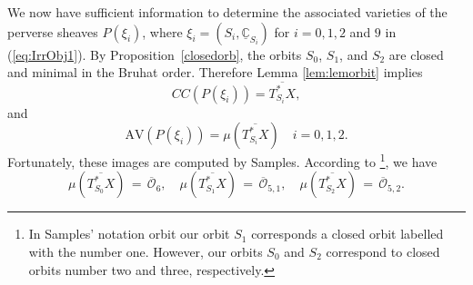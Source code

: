 \documentclass[a4paper, 11pt]{article}
\begin{document}
We now have sufficient information to determine the associated
varieties of the perverse sheaves $P(\xi_i)$, where $\xi_i = (S_i,
\underline{\mathbb{C}}_{S_i})$ for $i = 0, 1, 2$ and $9$ in (\ref{eq:IrrObj1}).  
By Proposition~\ref{closedorb}, the orbits $S_0$, $S_1$, and $S_2$ are
closed and minimal in the Bruhat order. Therefore  Lemma
\ref{lem:lemorbit} implies 
\begin{equation}
\label{CC012}
CC(P(\xi_i))=\overline{T_{S_{i}}^{\ast}X},
\end{equation}
and
$$
\mathrm{AV}(P(\xi_i))=\mu\left(\overline{T_{S_{i}}^{\ast}X}\right)
\quad i = 0,1,2.
$$
Fortunately, these images are computed by Samples. According to
\cite[{Proposition 4.1, tables 1 and 
    4}]{Samples}\footnote{In Samples' notation 
orbit our orbit $S_1$ corresponds a closed orbit labelled with the
number one. However, 
our orbits $S_0$ and $S_2$ correspond to closed orbits number two and
three, respectively. }, we have  
\begin{equation}\label{eq:momentmapfor012}
\mu\left(\overline{T_{S_{0}}^{\ast}X}\right)\, =\, \overline{\mathcal{O}}_{6},\quad
\mu\left(\overline{T_{S_{1}}^{\ast}X}\right)\, =\,
\overline{\mathcal{O}}_{5,1},\quad
\mu\left(\overline{T_{S_{2}}^{\ast}X}\right)\, =\,
\overline{\mathcal{O}}_{5,2}. 
\end{equation}
\end{document}
